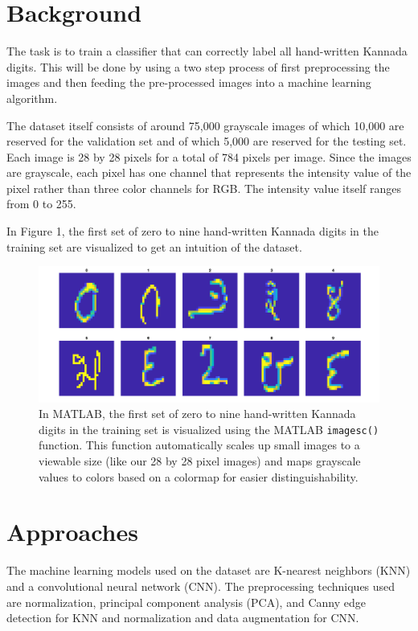 \documentclass{article}
\begin{document}
\section{Background}

The task is to train a classifier that can correctly label all hand-written
Kannada digits. This will be done by using a two step process of first
preprocessing the images and then feeding the pre-processed images into a
machine learning algorithm.

The dataset itself consists of around 75,000 grayscale images of which 10,000
are reserved for the validation set and of which 5,000 are reserved for the
testing set. Each image is 28 by 28 pixels for a total of 784 pixels per
image. Since the images are grayscale, each pixel has one channel that
represents the intensity value of the pixel rather than three color channels for
RGB. The intensity value itself ranges from 0 to 255.

In Figure 1, the first set of zero to nine hand-written Kannada digits in the
training set are visualized to get an intuition of the dataset.

\begin{figure}[h]
  \centering
  \includegraphics[width=0.65\linewidth]{digits.png}
  \caption{In MATLAB, the first set of zero to nine hand-written Kannada digits
    in the training set is visualized using the MATLAB \texttt{imagesc()}
    function. This function automatically scales up small images to a viewable
    size (like our 28 by 28 pixel images) and maps grayscale values to colors
    based on a colormap for easier distinguishability.}
\end{figure}

\section{Approaches}

The machine learning models used on the dataset are K-nearest neighbors (KNN)
and a convolutional neural network (CNN). The preprocessing techniques used are
normalization, principal component analysis (PCA), and Canny edge detection for
KNN and normalization and data augmentation for CNN.
\end{document}
